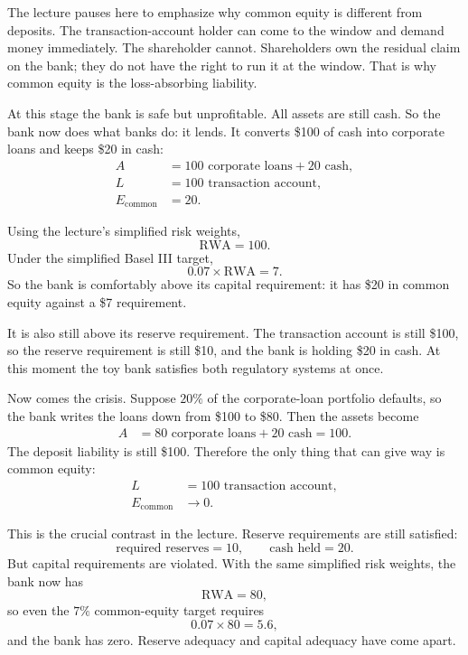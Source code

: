 The lecture pauses here to emphasize why common equity is different from deposits. The transaction-account holder can come to the window and demand money immediately. The shareholder cannot. Shareholders own the residual claim on the bank; they do not have the right to run it at the window. That is why common equity is the loss-absorbing liability.

At this stage the bank is safe but unprofitable. All assets are still cash. So the bank now does what banks do: it lends. It converts \$100 of cash into corporate loans and keeps \$20 in cash:
\begin{align}
A &= 100 \text{ corporate loans} + 20 \text{ cash}, \\
L &= 100 \text{ transaction account}, \\
E_{\text{common}} &= 20.
\end{align}

Using the lecture's simplified risk weights,
\begin{equation}
\text{RWA} = 100.
\end{equation}
Under the simplified Basel III target,
\begin{equation}
0.07 \times \text{RWA} = 7.
\end{equation}
So the bank is comfortably above its capital requirement: it has \$20 in common equity against a \$7 requirement.

It is also still above its reserve requirement. The transaction account is still \$100, so the reserve requirement is still \$10, and the bank is holding \$20 in cash. At this moment the toy bank satisfies both regulatory systems at once.

Now comes the crisis. Suppose \(20\%\) of the corporate-loan portfolio defaults, so the bank writes the loans down from \$100 to \$80. Then the assets become
\begin{align}
A &= 80 \text{ corporate loans} + 20 \text{ cash} = 100.
\end{align}
The deposit liability is still \$100. Therefore the only thing that can give way is common equity:
\begin{align}
L &= 100 \text{ transaction account}, \\
E_{\text{common}} &\to 0.
\end{align}

This is the crucial contrast in the lecture. Reserve requirements are still satisfied:
\begin{equation}
\text{required reserves} = 10, \qquad \text{cash held} = 20.
\end{equation}
But capital requirements are violated. With the same simplified risk weights, the bank now has
\begin{equation}
\text{RWA} = 80,
\end{equation}
so even the \(7\%\) common-equity target requires
\begin{equation}
0.07 \times 80 = 5.6,
\end{equation}
and the bank has zero. Reserve adequacy and capital adequacy have come apart.

